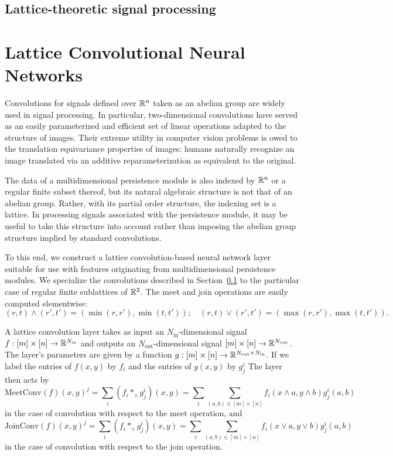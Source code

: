 \documentclass{article}
\begin{document}
\subsection{Lattice-theoretic signal processing}\label{sec:latticeconv}


\section{Lattice Convolutional Neural Networks}\label{sec:latticeCNN}

Convolutions for signals defined over $\mathbb{R}^n$ taken as an abelian group are
widely used in signal processing. In particular, two-dimensional convolutions
have served as an easily parameterized and efficient set of linear operations
adapted to the structure of images. Their extreme utility in computer vision
problems is owed to the translation equivariance properties of images: humans
naturally recognize an image translated via an additive reparameterization as
equivalent to the original.

The data of a multidimensional persistence module is also indexed by $\mathbb{R}^n$ or a
regular finite subset thereof, but its natural algebraic structure is not that
of an abelian group. Rather, with its partial order structure, the indexing set
is a lattice. In processing signals associated with the persistence module, it
may be useful to take this structure into account rather than imposing the
abelian group structure implied by standard convolutions.

To this end, we construct a lattice convolution-based neural network layer
suitable for use with features originating from multidimensional persistence
modules. We specialize the convolutions described in
Section~\ref{sec:latticeconv} to the particular case of regular finite
sublattices of $\mathbb{R}^2$. The meet and join operations are easily computed
elementwise:
\[(r,t) \wedge (r',t') = (\min(r,r'),\min(t,t'));\quad (r,t)\vee (r',t') =
  (\max(r,r'),\max(t,t')).\]

A lattice convolution layer takes as input an $N_{\text{in}}$-dimensional signal
$f : [m] \times [n] \to \mathbb{R}^{N_{\text{in}}}$ and outputs an
$N_{\text{out}}$-dimensional signal $ [m] \times [n] \to
\mathbb{R}^{N_{\text{out}}}$. The layer's parameters are given by a function $g: [m]
\times [n] \to \mathbb{R}^{N_{\text{out}}\times N_{\text{in}}}$. If we label the
entries of $f(x,y)$ by $f_i$ and the entries of $g(x,y)$ by $g^i_j$ The layer then acts by
\[\text{MeetConv}(f)(x,y)^j = \sum_{i} (f_i \ast_{\wedge} g^i_j)(x,y) = \sum_i
  \sum_{(a,b) \in [m]\times [n]} f_i(x \wedge a, y \wedge b)g^i_j(a,b)\]
in the case of convolution with respect to the meet operation, and
\[\text{JoinConv}(f)(x,y)^j = \sum_{i} (f_i \ast_{\vee} g^i_j)(x,y) = \sum_i
  \sum_{(a,b) \in [m]\times [n]} f_i(x \vee a, y \vee b)g^i_j(a,b)\]
in the case of convolution with respect to the join operation.
\end{document}
